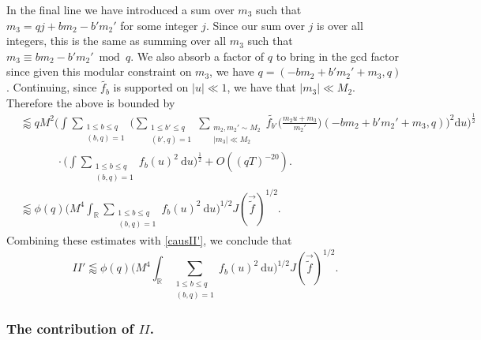 \documentclass[12pt]{amsart}
\theoremstyle{definition}
\theoremstyle{plain}
\theoremstyle{remark}
\numberwithin{equation}{section}
\numberwithin{theorem}{section}
\numberwithin{equation}{section}
\begin{document}
	In the final line we have introduced a sum over $m_3$ such that $m_3 = qj + bm_2 - b'm_2'$ for some integer $j$. Since our sum over $j$ is over all integers, this is the same as summing over all $m_3$ such that $m_3 \equiv bm_2 - b'm_2' \bmod q$. We also absorb a factor of $q$ to bring in the gcd factor since given this modular constraint on $m_3$, we have $q=(-bm_2+b'm_2'+m_3,q)$. Continuing, since $\tilde{f_b}$ is supported on $|u| \ll 1$, we have that $|m_3| \ll M_2$. Therefore the above is bounded by 
	\begin{align*}
		&\lessapprox qM^2\bigg(\int\sum_{\substack{1 \leq b \leq q \\ (b, q)=1}}
		\bigg(\sum_{\substack{1 \leq b' \leq q \\ (b', q)=1}}
		\sum_{\substack{m_{2}, m_2'\sim M_{2} \\ |m_3| \ll M_2}} \tilde{f_{b'}}\bigg(\frac{m_{2}u+m_{3}}{m_{2}'}\bigg)(-bm_{2}+b'm_{2}'+m_{3}, q)\bigg)^{2} \mathrm{d}u\bigg)^{\frac{1}{2}} 
		\\
		&  \phantom{abcdefg} \cdot\bigg(\int\sum_{\substack{1 \leq b \leq q \\ (b, q)=1}}
		f_{b}(u)^{2}\: \mathrm{d}u\bigg)^{\frac{1}{2}} +   O((qT)^{-20}).
		\\
		&\lessapprox \phi(q) \bigg(M^{4}\int_{\mathbb{R}}\sum_{\substack{1 \leq b \leq q \\ (b, q)=1}}f_{b}(u)^{2}\:\mathrm{d}u\bigg)^{1/2}J(\overrightarrow{\tilde{f}})^{1/2}.
	\end{align*}
	Combining these estimates with \eqref{causII'}, we conclude that
	\begin{equation}\label{conII'}
		II' \lessapprox \phi(q) \bigg(M^{4}\int_{\mathbb{R}}\sum_{\substack{1 \leq b \leq q \\ (b, q)=1}}f_{b}(u)^{2}\:\mathrm{d}u\bigg)^{1/2}J(\overrightarrow{\tilde{f}})^{1/2}.
	\end{equation}
	\subsubsection{The contribution of $II$.}\label{affTcII}
	
\end{document}
